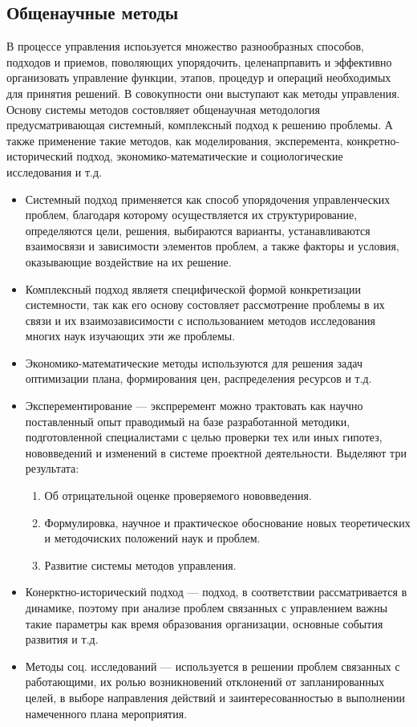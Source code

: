 \documentclass[a4paper,12pt,oneside,final]{extarticle}
\numberwithin{equation}{section}
\begin{document}
\subsection{Общенаучные методы}
В процессе управления испоьзуется множество разнообразных способов, подходов и приемов, поволяющих упорядочить, целенапрпавить и эффективно организовать управление функции, этапов, процедур и операций необходимых для принятия решений. 
В совокупности они выступают как методы управления. 
Основу системы методов состовляяет общенаучная методология предусматривающая системный, комплексный подход к решению проблемы. 
А также применение такие методов, как моделирования, эксперемента, конкретно-исторический подход, экономико-математические и социологические исследования и т.д.
\begin{itemize}
	\item Системный подход применяется как способ упорядочения управленческих проблем, благодаря которому осуществляется их структурирование, определяются цели, решения, выбираются варианты, устанавливаются взаимосвязи и зависимости элементов проблем, а также факторы и условия, оказывающие воздействие на их решение.
	\item Комплексный подход являетя специфической формой конкретизации системности, так как его основу состовляет рассмотрение проблемы в их связи и их взаимозависимости с использованием методов исследования многих наук изучающих эти же проблемы. 
	\item Экономико-математические методы используются для решения задач оптимизации плана, формирования цен, распределения ресурсов и т.д.
	\item Эксперементирование --- экспреремент можно трактовать как научно поставленный опыт праводимый на базе разработанной методики, подготовленной специалистами с целью проверки тех или иных гипотез, нововведений и изменений в системе проектной деятельности. 
	Выделяют три результата:
	\begin{enumerate} 
		\item Об отрицательной оценке проверяемого нововведения.
		\item Формулировка, научное и практическое обоснование новых теоретических и методочиских положений наук и проблем. 
		\item Развитие системы методов управления.
	\end{enumerate}
	\item Конерктно-исторический подход --- подход, в соответствии рассматривается в динамике, поэтому при анализе проблем связанных с управлением важны такие параметры как время образования организации, основные события развития и т.д.
	\item Методы соц. исследований --- используется в решении проблем связанных с работающими, их ролью возникновений отклонений от запланированных целей, в выборе направления действий и заинтересованностью в выполнении намеченного плана мероприятия. 
\end{itemize}
\end{document}
